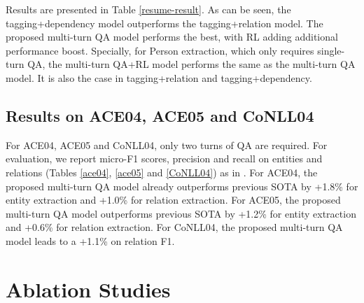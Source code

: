\documentclass[11pt,a4paper]{article}
\begin{document}
Results are presented in 
Table \ref{resume-result}. As can be seen, the tagging+dependency model outperforms the tagging+relation model. 
The proposed multi-turn QA model performs the best, with RL adding additional performance boost. 
Specially, for Person extraction, which only requires single-turn QA, the multi-turn QA+RL model performs the same as the multi-turn QA model. 
It is also the case in tagging+relation and tagging+dependency. 


\subsection{Results on ACE04, ACE05 and CoNLL04} 
For ACE04, ACE05 and CoNLL04, only two turns of QA are required. 
For evaluation, 
we report micro-F1 scores, precision and recall on entities and relations (Tables \ref{ace04}, \ref{ace05}
and \ref{CoNLL04}) as in .
For ACE04,  the proposed multi-turn QA  model already outperforms previous SOTA by +1.8\% for entity extraction and +1.0\% for relation extraction. 
For ACE05, the proposed multi-turn QA  model outperforms previous SOTA by +1.2\% for entity extraction and +0.6\% for relation extraction. 
For CoNLL04,
the proposed multi-turn QA model leads to a +1.1\% on relation F1.



\section{Ablation Studies}
\end{document}
